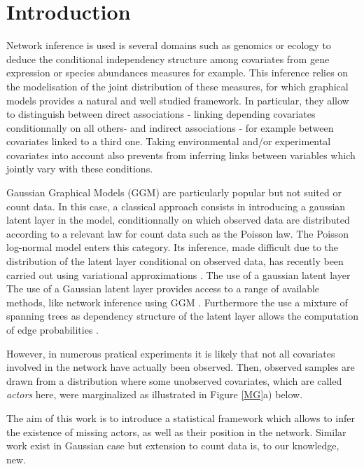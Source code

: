 \section*{Introduction}

Network inference is used is several domains such as genomics or ecology to deduce the conditional independency structure among covariates from gene expression  or species abundances measures for example. This inference relies on the modelisation of the joint distribution of these measures, for which graphical models provides a natural and well studied framework. In particular, they allow to distinguish between direct associations - linking depending covariates conditionnally on all others- and indirect associations - for example between covariates linked to a third one. Taking environmental and/or experimental covariates into account also prevents from inferring links between variables which jointly vary with these conditions.
  
  Gaussian Graphical Models (GGM) are particularly popular but not suited or count data. In this case, a classical approach consists in introducing a gaussian latent layer in the model, conditionnally on which observed data are distributed according to a relevant law for count data such as the Poisson law. The Poisson log-normal model \citep{AiH89} enters this category. Its inference,  made difficult due to  the distribution of the latent layer  conditional on observed data, has recently been carried out using variational approximations  \citep{BKM17}. The use of a gaussian latent layer The use of a Gaussian latent layer provides access to a range of available methods, like network inference using GGM \citep{CMR19}. Furthermore the use a mixture of spanning trees as dependency structure of the latent layer allows the computation of edge probabilities \citep{MRA20}.

However, in numerous pratical experiments it is likely that not all covariates involved in the network have actually been observed. Then, observed samples are drawn from a distribution where some  unobserved covariates, which are called \textit{actors} here, were marginalized as illustrated in Figure \ref{MG}a) below.

The aim of this work is to introduce a statistical framework which allows to infer the existence of missing actors, as well as their position in the network. Similar work exist in Gaussian case  \citep{EMlvggm,genvieve} but extension to count data is,  to our knowledge, new. 


